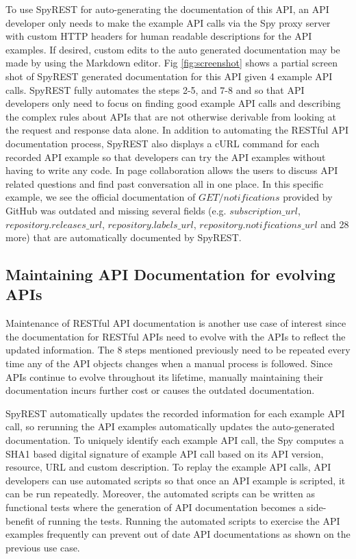 \documentclass[conference]{IEEEtran}
\begin{document}
To use SpyREST for auto-generating the documentation of this API, an API developer only needs to make the example API calls via the Spy proxy server with custom HTTP headers for human readable descriptions for the API examples. If desired, custom edits to the auto generated documentation may be made by using the Markdown editor. Fig \ref{fig:screenshot} shows a partial screen shot of SpyREST generated documentation for this API given 4 example API calls. SpyREST fully automates the steps 2-5, and 7-8 and so that API developers only need to focus on finding good example API calls and describing the complex rules about APIs that are not otherwise derivable from looking at the request and response data alone. In addition to automating the RESTful API documentation process, SpyREST also displays a cURL command for each recorded API example so that developers can try the API examples without having to write any code. In page collaboration allows the users to discuss API related questions and find past conversation all in one place. In this specific example, we see the official documentation of $GET /notifications$ provided by GitHub was outdated and missing several fields (e.g. $subscription\_url$, $repository.releases\_url$, $repository.labels\_url$, $repository.notifications\_url$ and 28 more) that are automatically documented by SpyREST.

\subsection{Maintaining API Documentation for evolving APIs} %
Maintenance of RESTful API documentation is another use case of interest since the documentation for RESTful APIs need to evolve with the APIs to reflect the updated information. The 8 steps mentioned previously need to be repeated every time any of the API objects changes when a manual process is followed. Since APIs continue to evolve throughout its lifetime, manually maintaining their documentation incurs further cost or causes the outdated documentation.

SpyREST automatically updates the recorded information for each example API call, so rerunning the API examples automatically updates the auto-generated documentation. To uniquely identify each example API call, the Spy computes a SHA1 based digital signature of example API call based on its API version, resource, URL and custom description. To replay the example API calls, API developers can use automated scripts so that once an API example is scripted, it can be run repeatedly. Moreover, the automated scripts can be written as functional tests where the generation of API documentation becomes a side-benefit of running the tests. Running the automated scripts to exercise the API examples frequently can prevent out of date API documentations as shown on the previous use case.
\end{document}
